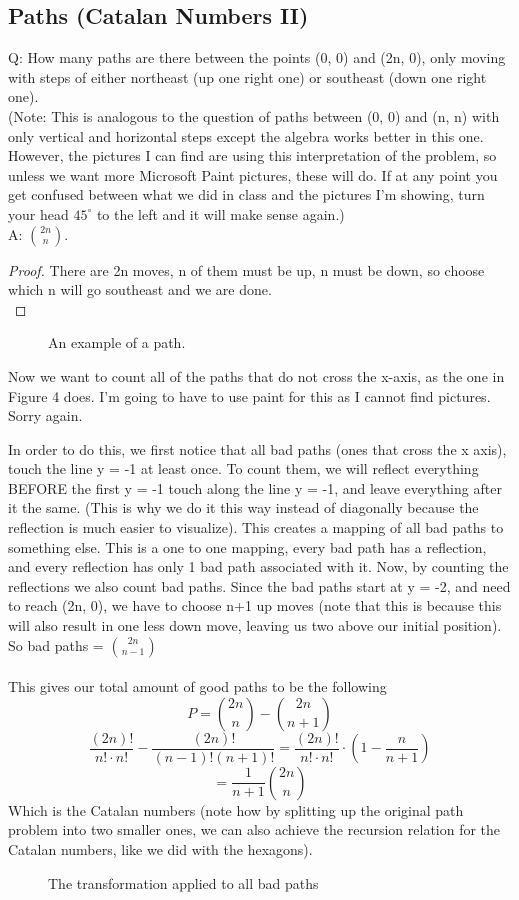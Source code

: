 \subsection{Paths (Catalan Numbers II)}
Q: How many paths are there between the points (0, 0) and (2n, 0), only moving with steps of either northeast (up one right one) or southeast (down one right one).\\ (Note: This is analogous to the question of paths between (0, 0) and (n, n) with only vertical and horizontal steps except the algebra works better in this one. However, the pictures I can find are using this interpretation of the problem, so unless we want more Microsoft Paint pictures, these will do. If at any point you get confused between what we did in class and the pictures I'm showing, turn your head $45^\circ$ to the left and it will make sense again.)\\
A: $\binom{2n} n$. 
\begin{proof}
    There are 2n moves, n of them must be up, n must be down, so choose which n will go southeast and we are done.\\
\end{proof}

\begin{figure}[h]
    \caption{An example of a path.}
     \label{fig:hex3}
\end{figure}

Now we want to count all of the paths that do not cross the x-axis, as the one in Figure 4 does. I'm going to have to use paint for this as I cannot find pictures. Sorry again. 

In order to do this, we first notice that all bad paths (ones that cross the x axis), touch the line y = -1 at least once. To count them, we will reflect everything BEFORE the first y = -1 touch along the line y = -1, and leave everything after it the same. (This is why we do it this way instead of diagonally because the reflection is much easier to visualize). This creates a mapping of all bad paths to something else. This is a one to one mapping, every bad path has a reflection, and every reflection has only 1 bad path associated with it. Now, by counting the reflections we also count bad paths. Since the bad paths start at y = -2, and need to reach (2n, 0), we have to choose n+1 up moves (note that this is because this will also result in one less down move, leaving us two above our initial position). \\So bad paths = $\binom{2n}{n-1}$
\\
\\
This gives our total amount of good paths to be the following $$P = \binom{2n}{n} - \binom{2n}{n+1}$$ $$\frac{(2n)!}{n!\cdot n!}-\frac{(2n)!}{(n-1)!(n+1)!} = \frac{(2n)!}{n!\cdot n!} \cdot(1-\frac{n}{n+1})$$
$$= \frac{1}{n+1}\binom{2n} n$$
Which is the Catalan numbers (note how by splitting up the original path problem into two smaller ones, we can also achieve the recursion relation for the Catalan numbers, like we did with the hexagons).

\begin{figure}[h]
    \caption{The transformation applied to all bad paths}
     \label{fig:hex4}
\end{figure}
% 
